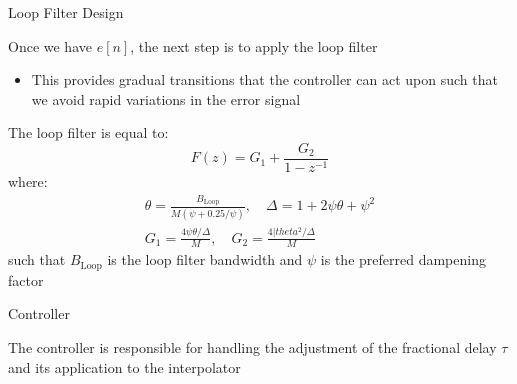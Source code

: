 \documentclass[10pt]{beamer}
\begin{document}
\begin{frame}[fragile]{Loop Filter Design}

Once we have $e[n]$, the next step is to apply the loop filter
\begin{itemize}
 \item This provides gradual transitions that the controller can act upon such that we avoid rapid variations in the error signal
\end{itemize}

The loop filter is equal to:
\begin{equation}
 F(z)=G_1+\frac{G_2}{1-z^{-1}}
\end{equation}
where:
\begin{align}
 \theta=\frac{B_{\mathrm{Loop}}}{M(\psi+0.25/\psi)},\quad\Delta=1+2\psi\theta+\psi^2\\
 G_1=\frac{4\psi\theta/\Delta}{M},\quad{G_2}=\frac{4|theta^2/\Delta}{M}
\end{align}
such that $B_{\mathrm{Loop}}$ is the loop filter bandwidth and $\psi$ is the preferred dampening factor

\end{frame}



\begin{frame}[fragile]{Controller}

The controller is responsible for handling the adjustment of the fractional delay $\tau$ and its application to the interpolator

\end{frame}
\end{document}
